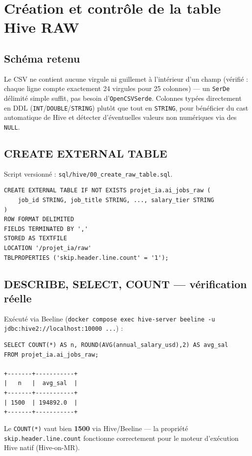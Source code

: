 \chapter{Création et contrôle de la table Hive RAW}

\section{Schéma retenu}

Le CSV ne contient aucune virgule ni guillemet à l'intérieur d'un
champ (vérifié : chaque ligne compte exactement 24 virgules pour 25
colonnes) — un \texttt{SerDe} délimité simple suffit, pas besoin
d'\texttt{OpenCSVSerde}. Colonnes typées directement en DDL
(\texttt{INT}/\texttt{DOUBLE}/\texttt{STRING}) plutôt que tout en
\texttt{STRING}, pour bénéficier du cast automatique de Hive et
détecter d'éventuelles valeurs non numériques via des \texttt{NULL}.

\section{CREATE EXTERNAL TABLE}

Script versionné : \texttt{sql/hive/00\_create\_raw\_table.sql}.

\begin{verbatim}
CREATE EXTERNAL TABLE IF NOT EXISTS projet_ia.ai_jobs_raw (
    job_id STRING, job_title STRING, ..., salary_tier STRING
)
ROW FORMAT DELIMITED
FIELDS TERMINATED BY ','
STORED AS TEXTFILE
LOCATION '/projet_ia/raw'
TBLPROPERTIES ('skip.header.line.count' = '1');
\end{verbatim}

\section{DESCRIBE, SELECT, COUNT — vérification réelle}

Exécuté via Beeline (\texttt{docker compose exec hive-server beeline
-u jdbc:hive2://localhost:10000 ...}) :

\begin{verbatim}
SELECT COUNT(*) AS n, ROUND(AVG(annual_salary_usd),2) AS avg_sal
FROM projet_ia.ai_jobs_raw;

+-------+-----------+
|   n   |  avg_sal  |
+-------+-----------+
| 1500  | 194892.0  |
+-------+-----------+
\end{verbatim}

Le \texttt{COUNT(*)} vaut bien \textbf{1500} via Hive/Beeline — la
propriété \texttt{skip.header.line.count} fonctionne correctement pour
le moteur d'exécution Hive natif (Hive-on-MR).

